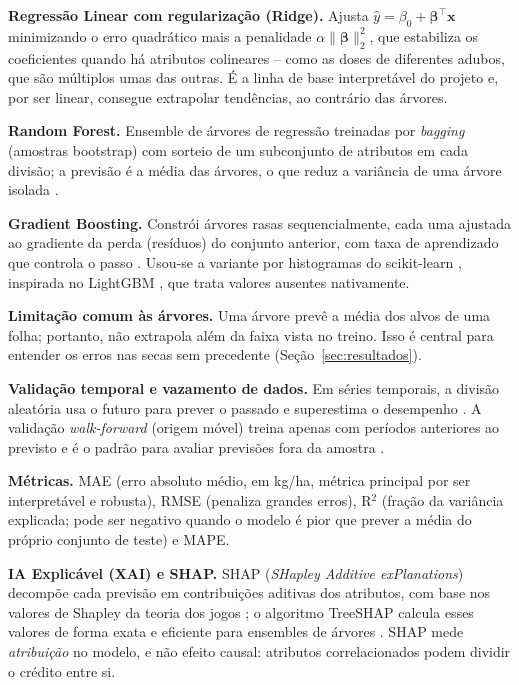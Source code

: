 \documentclass[12pt]{article}
\begin{document}
\textbf{Regressão Linear com regularização (Ridge).} Ajusta
$\hat{y}=\beta_0+\boldsymbol{\beta}^\top\mathbf{x}$ minimizando o erro
quadrático mais a penalidade $\alpha\|\boldsymbol{\beta}\|_2^2$, que
estabiliza os coeficientes quando há atributos colineares
\cite{hoerl1970} -- como as doses de diferentes adubos, que são múltiplos
umas das outras. É a linha de base interpretável do projeto e, por ser
linear, consegue extrapolar tendências, ao contrário das árvores.

\textbf{Random Forest.} Ensemble de árvores de regressão treinadas por
\emph{bagging} (amostras bootstrap) com sorteio de um subconjunto de
atributos em cada divisão; a previsão é a média das árvores, o que reduz a
variância de uma árvore isolada \cite{breiman2001}.

\textbf{Gradient Boosting.} Constrói árvores rasas sequencialmente, cada
uma ajustada ao gradiente da perda (resíduos) do conjunto anterior, com
taxa de aprendizado que controla o passo \cite{friedman2001}. Usou-se a
variante por histogramas do scikit-learn \cite{pedregosa2011}, inspirada no
LightGBM \cite{ke2017}, que trata valores ausentes nativamente.

\textbf{Limitação comum às árvores.} Uma árvore prevê a média dos alvos de
uma folha; portanto, não extrapola além da faixa vista no treino. Isso é
central para entender os erros nas secas sem precedente
(Seção~\ref{sec:resultados}).

\textbf{Validação temporal e vazamento de dados.} Em séries temporais, a
divisão aleatória usa o futuro para prever o passado e superestima o
desempenho \cite{kaufman2012}. A validação \emph{walk-forward} (origem
móvel) treina apenas com períodos anteriores ao previsto e é o padrão para
avaliar previsões fora da amostra \cite{tashman2000}.

\textbf{Métricas.} MAE (erro absoluto médio, em kg/ha, métrica principal
por ser interpretável e robusta), RMSE (penaliza grandes erros), R$^2$
(fração da variância explicada; pode ser negativo quando o modelo é pior que
prever a média do próprio conjunto de teste) e MAPE.

\textbf{IA Explicável (XAI) e SHAP.} SHAP (\emph{SHapley Additive
exPlanations}) decompõe cada previsão em contribuições aditivas dos
atributos, com base nos valores de Shapley da teoria dos jogos
\cite{lundberg2017}; o algoritmo TreeSHAP calcula esses valores de forma
exata e eficiente para ensembles de árvores \cite{lundberg2020}. SHAP mede
\emph{atribuição} no modelo, e não efeito causal: atributos correlacionados
podem dividir o crédito entre si.
\end{document}
